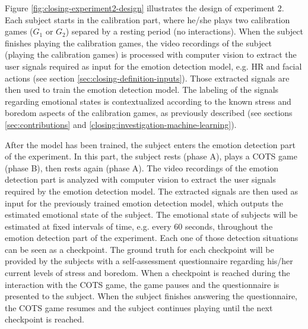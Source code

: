 Figure \ref{fig:closing-experiment2-design} illustrates the design of experiment 2. Each subject starts in the calibration part, where he/she plays two calibration games ($G_1$ or $G_2$) separed by a resting period (no interactions). When the subject finishes playing the calibration games, the video recordings of the subject (playing the calibration games) is processed with computer vision to extract the user signals required as input for the emotion detection model, e.g. HR and facial actions (see section \ref{sec:closing-definition-inputs}). Those extracted signals are then used to train the emotion detection model. The labeling of the signals regarding emotional states is contextualized according to the known stress and boredom aspects of the calibration games, as previously described (see sections \ref{sec:contributions} and \ref{closing:investigation-machine-learning}).

After the model has been trained, the subject enters the emotion detection part of the experiment. In this part, the subject rests (phase A), plays a COTS game (phase B), then rests again (phase A). The video recordings of the emotion detection part is analyzed with computer vision to extract the user signals required by the emotion detection model. The extracted signals are then used as input for the previously trained emotion detection model, which outputs the estimated emotional state of the subject. The emotional state of subjects will be estimated at fixed intervals of time, e.g. every 60 seconds, throughout the emotion detection part of the experiment. Each one of those detection situations can be seen as a checkpoint. The ground truth for each checkpoint will be provided by the subjects with a self-assessment questionnaire regarding his/her current levels of stress and boredom. When a checkpoint is reached during the interaction with the COTS game, the game pauses and the questionnaire is presented to the subject. When the subject finishes answering the questionnaire, the COTS game resumes and the subject continues playing until the next checkpoint is reached.

